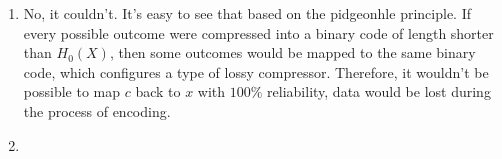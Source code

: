 \documentclass{article}
\begin{document}
\begin{enumerate}
	\item No, it couldn't. It's easy to see that based on the pidgeonhle principle. If every possible outcome were compressed into a binary code of length shorter than \(H_0(X)\), then some outcomes would be mapped to the same binary code, which configures a type of lossy compressor. Therefore, it wouldn't be possible to map \(c\) back to \(x\) with \(100\%\) reliability, data would be lost during the process of encoding.

	\item

\end{enumerate}


\end{document}
